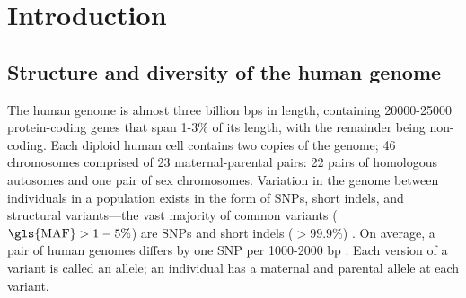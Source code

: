 %
%


\chapter{Introduction}

\begin{outline}

\section{Structure and diversity of the human genome}

\1 The human genome is almost three billion \glspl{bp} in length, 
containing 20000-25000 protein-coding genes \autocite{theencodeprojectconsortium2012IntegratedEncyclopediaDNA,1000genomesprojectconsortium2015GlobalReferenceHuman} that span 1-3\% of its length, 
with the remainder being non-coding.
Each diploid human cell contains two copies of the genome; 46 chromosomes comprised of 23 maternal-parental pairs: 22 pairs of homologous autosomes and one pair of sex chromosomes.
%
\1 Variation in the genome between individuals in a population exists in the form of \glspl{SNP}, short indels, and structural variants---the vast majority of common variants ($\text{\gls{MAF}} > 1-5\%$) are \glspl{SNP} and short indels ($> 99.9\%$) \autocite{1000genomesprojectconsortium2015GlobalReferenceHuman}.
On average, a pair of human genomes differs by one \gls{SNP} per 1000-2000 \gls{bp} \autocite{theinternationalsnpmapworkinggroup2001MapHumanGenome}.
Each version of a variant is called an allele; an individual has a maternal and parental allele at each variant.


\end{outline}
